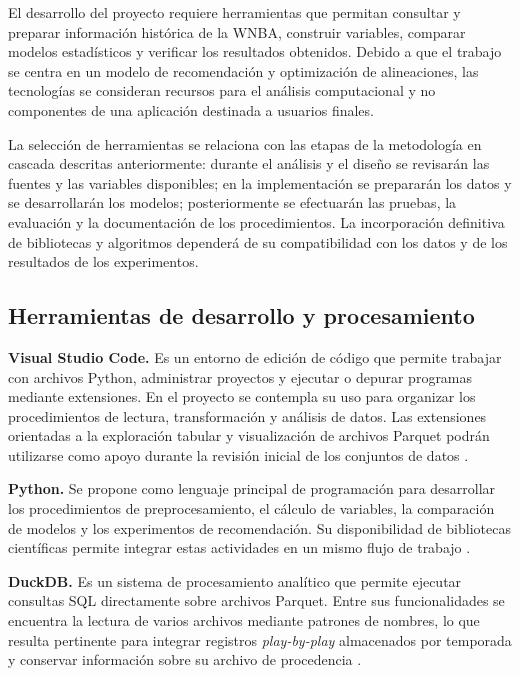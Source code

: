 El desarrollo del proyecto requiere herramientas que permitan consultar y preparar información histórica de la WNBA, construir variables, comparar modelos estadísticos y verificar los resultados obtenidos. Debido a que el trabajo se centra en un modelo de recomendación y optimización de alineaciones, las tecnologías se consideran recursos para el análisis computacional y no componentes de una aplicación destinada a usuarios finales.

La selección de herramientas se relaciona con las etapas de la metodología en cascada descritas anteriormente: durante el análisis y el diseño se revisarán las fuentes y las variables disponibles; en la implementación se prepararán los datos y se desarrollarán los modelos; posteriormente se efectuarán las pruebas, la evaluación y la documentación de los procedimientos. La incorporación definitiva de bibliotecas y algoritmos dependerá de su compatibilidad con los datos y de los resultados de los experimentos.

\subsection{Herramientas de desarrollo y procesamiento}

\textbf{Visual Studio Code.} Es un entorno de edición de código que permite trabajar con archivos Python, administrar proyectos y ejecutar o depurar programas mediante extensiones. En el proyecto se contempla su uso para organizar los procedimientos de lectura, transformación y análisis de datos. Las extensiones orientadas a la exploración tabular y visualización de archivos Parquet podrán utilizarse como apoyo durante la revisión inicial de los conjuntos de datos \cite{vscodePythonOficial}.

\textbf{Python.} Se propone como lenguaje principal de programación para desarrollar los procedimientos de preprocesamiento, el cálculo de variables, la comparación de modelos y los experimentos de recomendación. Su disponibilidad de bibliotecas científicas permite integrar estas actividades en un mismo flujo de trabajo \cite{pythonDocsOficial,numpyDocsOficial}.

\textbf{DuckDB.} Es un sistema de procesamiento analítico que permite ejecutar consultas SQL directamente sobre archivos Parquet. Entre sus funcionalidades se encuentra la lectura de varios archivos mediante patrones de nombres, lo que resulta pertinente para integrar registros \textit{play-by-play} almacenados por temporada y conservar información sobre su archivo de procedencia \cite{duckdbParquetOficial,duckdbMultipleFilesOficial}.

